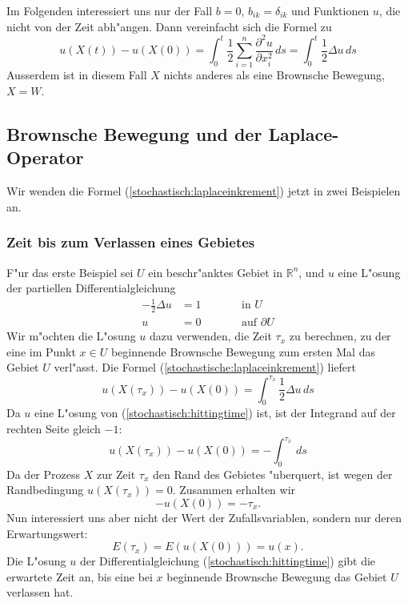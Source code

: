 Im Folgenden interessiert uns nur der Fall $b=0$, $b_{ik}=\delta_{ik}$
und Funktionen $u$, die nicht von der Zeit abh"angen.
Dann vereinfacht sich die Formel zu
\begin{equation}
u(X(t))-u(X(0))
=
\int_0^t \frac12\sum_{i=1}^n\frac{\partial^2 u}{\partial x_i^2}\,ds
=
\int_0^t \frac12\Delta u\,ds
\label{stochastisch:laplaceinkrement}
\end{equation}
Ausserdem ist in diesem Fall $X$ nichts anderes als eine Brownsche Bewegung,
$X=W$.

\subsection{Brownsche Bewegung und der Laplace-Operator}
Wir wenden die Formel (\ref{stochastisch:laplaceinkrement}) jetzt in
zwei Beispielen an.

\subsubsection{Zeit bis zum Verlassen eines Gebietes}
F"ur das erste Beispiel sei $U$ ein beschr"anktes Gebiet in
$\mathbb R^n$, und $u$ eine L"osung der partiellen Differentialgleichung
\begin{equation}
\begin{aligned}
-\frac12\Delta u&=1&\qquad&\text{in $U$}\\
               u&=0&      &\text{auf $\partial U$}
\end{aligned}
\label{stochastisch:hittingtime}
\end{equation}
Wir m"ochten die L"osung $u$ dazu verwenden, die Zeit $\tau_x$ zu berechnen,
zu der eine im Punkt $x\in U$ beginnende Brownsche Bewegung zum ersten
Mal das Gebiet $U$ verl"asst.
Die Formel (\ref{stochastische:laplaceinkrement}) liefert
\[
u(X(\tau_x))-u(X(0)) = \int_0^{\tau_x} \frac12\Delta u\,ds
\]
Da $u$ eine L"osung von (\ref{stochastisch:hittingtime}) ist, ist der 
Integrand auf der rechten Seite gleich $-1$:
\[
u(X(\tau_x))-u(X(0)) = -\int_0^{\tau_x} \,ds
\]
Da der Prozess $X$ zur Zeit $\tau_x$ den Rand des Gebietes "uberquert,
ist wegen der Randbedingung $u(X(\tau_x))=0$. 
Zusammen erhalten wir
\[
-u(X(0)) = -\tau_x.
\]
Nun interessiert uns aber nicht der Wert der Zufallsvariablen, sondern
nur deren Erwartungswert:
\[
E(\tau_x)=E(u(X(0)))=u(x).
\]
Die L"osung $u$ der Differentialgleichung (\ref{stochastisch:hittingtime})
gibt die erwartete Zeit an, bis eine bei $x$ beginnende Brownsche Bewegung 
das Gebiet $U$ verlassen hat.

